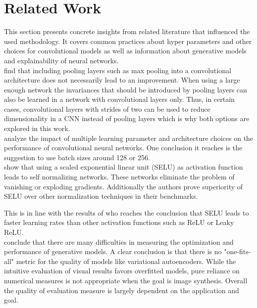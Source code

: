 \section{Related Work} \label{related_work_general_architecture}

This section presents concrete insights from related literature that influenced the used methodology.
It covers common practices about
hyper parameters and other choices for convolutional models as well as information about 
generative models and explainability of neural networks.\\

\textcite{2015-springenberg-striving}
find that including pooling layers such as max pooling into a convolutional architecture does not 
necessarily lead to an improvement. When using a large enough network the invariances that should be
introduced by pooling layers can also be learned in a network with convolutional layers only. Thus, in certain cases,
convolutional layers with strides of two can be used to reduce dimensionality in a CNN instead of pooling layers
which is why both options are explored in this work.
\\

\textcite{2016-mishkin-systematic} analyze
the impact of multiple learning parameter and architecture choices on the performance of convolutional neural networks.
One conclusion it reaches is the suggestion to use batch sizes around 128 or 256.\\

\textcite{2017-klambauer-selu} show that using
a scaled exponential linear unit (SELU) as activation function leads to self normalizing networks. These networks 
eliminate the problem of vanishing or exploding gradients. Additionally the authors prove superiority of SELU 
over other normalization techniques in their benchmarks. 

This is in line with the results of \textcite{2018-Pedamonti-comparison} who reaches the conclusion that SELU leads
to faster learning rates than other activation functions such as ReLU or Leaky ReLU.\\

\textcite{2015-theis-generative}
conclude that there are many difficulties in
measuring the optimization and performance of generative models. A clear conclusion is that there is no 
"one-fits-all" metric for the quality of models like variational autoencoders. While the intuitive evaluation
of visual results favors overfitted models, pure reliance on numerical measures is not appropriate when the
goal is image synthesis. Overall the quality of evaluation measure is largely dependent on the application
and goal.\\

